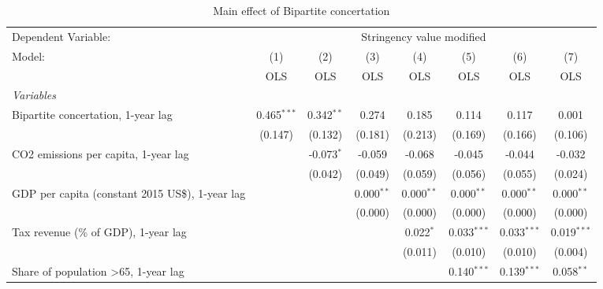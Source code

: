 
\begin{table}[htbp]
   \caption{Main effect of Bipartite concertation}
   \centering
   \begin{tabular}{lccccccc}
      \toprule
      Dependent Variable: & \multicolumn{7}{c}{Stringency value modified}\\
      Model:                                                & (1)           & (2)          & (3)          & (4)          & (5)           & (6)           & (7)\\  
                                                            &  OLS          & OLS          & OLS          & OLS          & OLS           & OLS           & OLS\\  
      \midrule
      \emph{Variables}\\
      Bipartite concertation, 1-year lag                    & 0.465$^{***}$ & 0.342$^{**}$ & 0.274        & 0.185        & 0.114         & 0.117         & 0.001\\   
                                                            & (0.147)       & (0.132)      & (0.181)      & (0.213)      & (0.169)       & (0.166)       & (0.106)\\   
      CO2 emissions per capita, 1-year lag                  &               & -0.073$^{*}$ & -0.059       & -0.068       & -0.045        & -0.044        & -0.032\\   
                                                            &               & (0.042)      & (0.049)      & (0.059)      & (0.056)       & (0.055)       & (0.024)\\   
      GDP per capita (constant 2015 US\$), 1-year lag       &               &              & 0.000$^{**}$ & 0.000$^{**}$ & 0.000$^{**}$  & 0.000$^{**}$  & 0.000$^{**}$\\   
                                                            &               &              & (0.000)      & (0.000)      & (0.000)       & (0.000)       & (0.000)\\   
      Tax revenue (\% of GDP), 1-year lag                   &               &              &              & 0.022$^{*}$  & 0.033$^{***}$ & 0.033$^{***}$ & 0.019$^{***}$\\   
                                                            &               &              &              & (0.011)      & (0.010)       & (0.010)       & (0.004)\\   
      Share of population >65, 1-year lag                   &               &              &              &              & 0.140$^{***}$ & 0.139$^{***}$ & 0.058$^{**}$\\   

\end{tabular}
\end{table}
